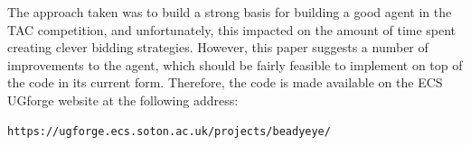 \documentclass{acm_proc_article-sp}
\begin{document}
 The approach taken was to build a strong basis for building a good agent in the TAC competition, and unfortunately, this impacted on the amount of time spent creating clever bidding strategies.  However, this paper suggests a number of improvements to the agent, which should be fairly feasible to implement on top of the code in its current form.  Therefore, the code is made available on the ECS UGforge website at the following address: \begin{verbatim}https://ugforge.ecs.soton.ac.uk/projects/beadyeye/\end{verbatim}

%


%
%
\balancecolumns
\end{document}
